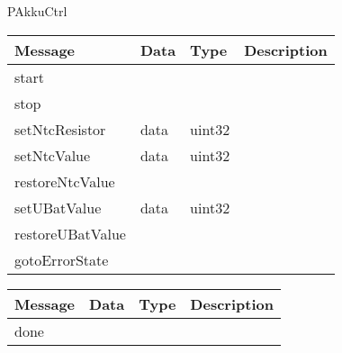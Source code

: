  {PAkkuCtrl}

\begin{tabular}[ht]{|l|l|l|p{8cm}|}
\hline
Message & Data & Type & Description\\
\hline
start &  &  & \\
\hline
stop &  &  & \\
\hline
setNtcResistor &  data  &  uint32  & \\
\hline
setNtcValue &  data  &  uint32  & \\
\hline
restoreNtcValue &  &  & \\
\hline
setUBatValue &  data  &  uint32  & \\
\hline
restoreUBatValue &  &  & \\
\hline
gotoErrorState &  &  & \\
\hline
\end{tabular}
\begin{tabular}[ht]{|l|l|l|p{8cm}|}
\hline
Message & Data & Type & Description\\
\hline
done &  &  & \\
\hline
\end{tabular}
